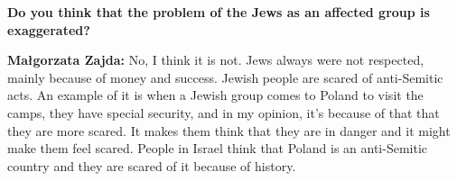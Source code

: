 \textbf{Do you think that the problem of the Jews as an affected group is exaggerated?}

\textbf{Małgorzata Zajda:} No, I think it is not. Jews always were not respected, mainly because of money and success. 
Jewish people are scared of anti-Semitic acts. An example of it is when a Jewish group comes to Poland to visit the camps, they have special security, and in my opinion, it’s because of that that they are more scared. It makes them think that they are in danger and it might make them feel scared. People in Israel think that Poland is an anti-Semitic country and they are scared of it because of history.  

 

 